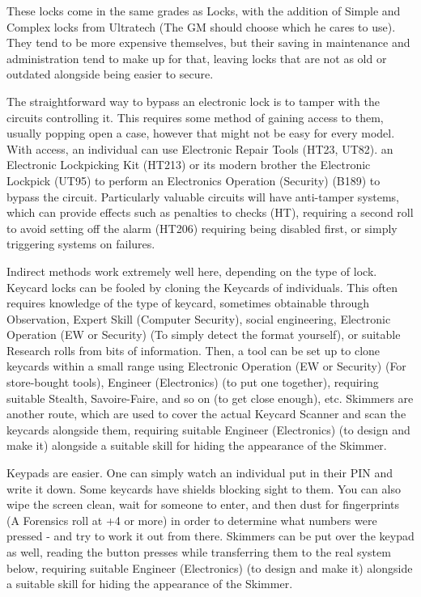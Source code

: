 \begin{multicols}{2}
	These locks come in the same grades as Locks, with the addition of Simple and Complex locks from Ultratech (The GM should choose which he cares to use). They tend to be more expensive themselves, but their saving in maintenance and administration tend to make up for that, leaving locks that are not as old or outdated alongside being easier to secure.
	
	The straightforward way to bypass an electronic lock is to tamper with the circuits controlling it. This requires some method of gaining access to them, usually popping open a case, however that might not be easy for every model. With access, an individual can use Electronic Repair Tools (HT23, UT82). an Electronic Lockpicking Kit (HT213) or its modern brother the Electronic Lockpick (UT95) to perform an Electronics Operation (Security) (B189) to bypass the circuit. Particularly valuable circuits will have anti-tamper systems, which can provide effects such as penalties to checks (HT), requiring a second roll to avoid setting off the alarm (HT206) requiring being disabled first, or simply triggering systems on failures.
	
	Indirect methods work extremely well here, depending on the type of lock. Keycard locks can be fooled by cloning the Keycards of individuals. This often requires knowledge of the type of keycard, sometimes obtainable through Observation, Expert Skill (Computer Security), social engineering, Electronic Operation (EW or Security) (To simply detect the format yourself), or suitable Research rolls from bits of information. Then, a tool can be set up to clone keycards within a small range using Electronic Operation (EW or Security) (For store-bought tools), Engineer (Electronics) (to put one together), requiring suitable Stealth, Savoire-Faire, and so on (to get close enough), etc. Skimmers are another route, which are used to cover the actual Keycard Scanner and scan the keycards alongside them, requiring suitable Engineer (Electronics) (to design and make it) alongside a suitable skill for hiding the appearance of the Skimmer.
	
	Keypads are easier. One can simply watch an individual put in their PIN and write it down. Some keycards have shields blocking sight to them. You can also wipe the screen clean, wait for someone to enter, and then dust for fingerprints (A Forensics roll at +4 or more) in order to determine what numbers were pressed - and try to work it out from there. Skimmers can be put over the keypad as well, reading the button presses while transferring them to the real system below, requiring suitable Engineer (Electronics) (to design and make it) alongside a suitable skill for hiding the appearance of the Skimmer.
	

\end{multicols}
